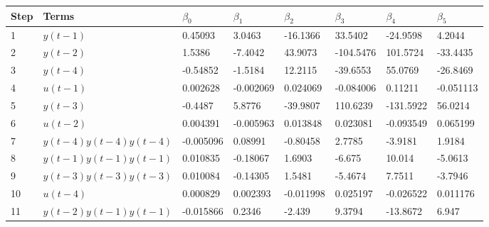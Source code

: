 \begin{tabular}{llllllll}
Step & Terms & $\beta_{0}$ & $\beta_{1}$ & $\beta_{2}$ & $\beta_{3}$ & $\beta_{4}$ & $\beta_{5}$ \\ 
\hline 
1 & $y(t-1)$ & 0.45093 & 3.0463 & -16.1366 & 33.5402 & -24.9598 & 4.2044 \\ 
2 & $y(t-2)$ & 1.5386 & -7.4042 & 43.9073 & -104.5476 & 101.5724 & -33.4435 \\ 
3 & $y(t-4)$ & -0.54852 & -1.5184 & 12.2115 & -39.6553 & 55.0769 & -26.8469 \\ 
4 & $u(t-1)$ & 0.002628 & -0.002069 & 0.024069 & -0.084006 & 0.11211 & -0.051113 \\ 
5 & $y(t-3)$ & -0.4487 & 5.8776 & -39.9807 & 110.6239 & -131.5922 & 56.0214 \\ 
6 & $u(t-2)$ & 0.004391 & -0.005963 & 0.013848 & 0.023081 & -0.093549 & 0.065199 \\ 
7 & $y(t-4)y(t-4)y(t-4)$ & -0.005096 & 0.08991 & -0.80458 & 2.7785 & -3.9181 & 1.9184 \\ 
8 & $y(t-1)y(t-1)y(t-1)$ & 0.010835 & -0.18067 & 1.6903 & -6.675 & 10.014 & -5.0613 \\ 
9 & $y(t-3)y(t-3)y(t-3)$ & 0.010084 & -0.14305 & 1.5481 & -5.4674 & 7.7511 & -3.7946 \\ 
10 & $u(t-4)$ & 0.000829 & 0.002393 & -0.011998 & 0.025197 & -0.026522 & 0.011176 \\ 
11 & $y(t-2)y(t-1)y(t-1)$ & -0.015866 & 0.2346 & -2.439 & 9.3794 & -13.8672 & 6.947 \\ 
\hline 
\end{tabular}